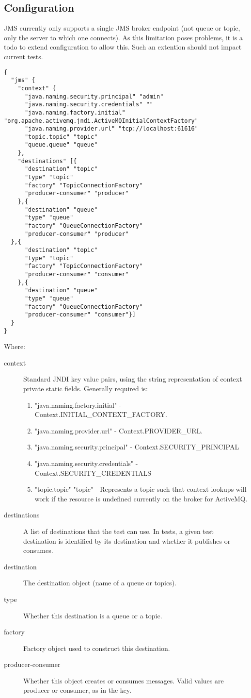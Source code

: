 \documentclass[12pt,a4paper,koma]{article}
\begin{document}
\subsection{Configuration}
\label{sec-4-1}
JMS currently only supports a single JMS broker endpoint (not queue or topic,
only the server to which one connects). As this limitation poses problems, it
is a todo to extend configuration to allow this. Such an extention should not
impact current tests.

\begin{verbatim}
{
  "jms" {
    "context" {
      "java.naming.security.principal" "admin"
      "java.naming.security.credentials" ""
      "java.naming.factory.initial" "org.apache.activemq.jndi.ActiveMQInitialContextFactory"
      "java.naming.provider.url" "tcp://localhost:61616"
      "topic.topic" "topic"
      "queue.queue" "queue"
    },
    "destinations" [{
      "destination" "topic"
      "type" "topic"
      "factory" "TopicConnectionFactory"
      "producer-consumer" "producer"
    },{
      "destination" "queue"
      "type" "queue"
      "factory" "QueueConnectionFactory"
      "producer-consumer" "producer"
  },{
      "destination" "topic"
      "type" "topic"
      "factory" "TopicConnectionFactory"
      "producer-consumer" "consumer"
    },{
      "destination" "queue"
      "type" "queue"
      "factory" "QueueConnectionFactory"
      "producer-consumer" "consumer"}]
  }
}
\end{verbatim}

Where:
\begin{description}
\item[{context}] Standard JNDI key value pairs, using the string representation of
context private static fields. Generally required is:
\begin{enumerate}
\item "java.naming.factory.initial" - Context.INITIAL\_CONTEXT\_FACTORY.
\item "java.naming.provider.url" - Context.PROVIDER\_URL.
\item "java.naming.security.principal" - Context.SECURITY\_PRINCIPAL
\item "java.naming.security.credentials" - Context.SECURITY\_CREDENTIALS
\item "topic.topic" "topic" - Represents a topic such that context lookups will
work if the resource is undefined currently on the broker for ActiveMQ.
\end{enumerate}
\item[{destinations}] A list of destinations that the test can use. In tests,
a given test destination is identified by its destination and whether it
publishes or consumes.
\item[{destination}] The destination object (name of a queue or topics).
\item[{type}] Whether this destination is a queue or a topic.
\item[{factory}] Factory object used to construct this destination.
\item[{producer-consumer}] Whether this object creates or consumes messages. Valid
values are producer or consumer, as in the key.
\end{description}
\end{document}
